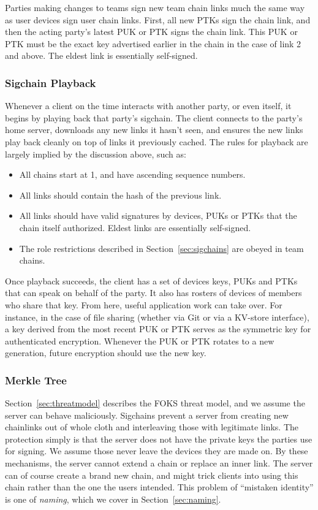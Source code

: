 Parties making changes to teams sign new team chain links much the same way as user devices
sign user chain links. First, all new PTKs sign the chain link, and then the acting
party's latest PUK or PTK signs the chain link. This PUK or PTK must be the exact key
advertised earlier in the chain in the case of link 2 and above. The eldest link
is essentially self-signed.

\subsubsection{Sigchain Playback}

Whenever a client on the time interacts with another party, or even itself, it
begins by playing back that party's sigchain. The client connects to the party's home
server, downloads any new links it hasn't seen, and ensures the new links play back
cleanly on top of links it previously cached. The rules for playback are largely
implied by the discussion above, such as:

\begin{itemize}\itemsep0em
    \item All chains start at 1, and have ascending sequence numbers.
    \item All links should contain the hash of the previous link.
    \item All links should have valid signatures by devices, PUKs or PTKs that the chain 
      itself authorized. Eldest links are essentially self-signed.
    \item The role restrictions described in Section~\ref{sec:sigchains} are obeyed in team chains.
\end{itemize}

Once playback succeeds, the client has a set of devices keys, PUKs and PTKs that can
speak on behalf of the party. It also has rosters of devices of members who share that
key. From here, useful application work can take over. For instance, in the case
of file sharing (whether via Git or via a KV-store interface), a key derived from the
most recent PUK or PTK serves as the symmetric key for authenticated encryption. 
Whenever the PUK or PTK rotates to a new generation, future encryption should use the
new key.

\subsubsection{Merkle Tree}
\label{sec:merkle}

Section~\ref{sec:threatmodel} describes the FOKS threat model, and we assume the
server can behave maliciously.  Sigchains prevent a server from creating new
chainlinks out of whole cloth and interleaving those with legitimate links. The
protection simply is that the server does not have the private keys the parties
use for signing. We assume those never leave the devices they are made on. By these 
mechanisms, the server cannot extend a chain or replace an inner link. The server can
of course create a brand new chain, and might trick clients into using this chain
rather than the one the users intended. This problem of ``mistaken identity'' is one
of \textit{naming}, which we cover in Section~\ref{sec:naming}.


